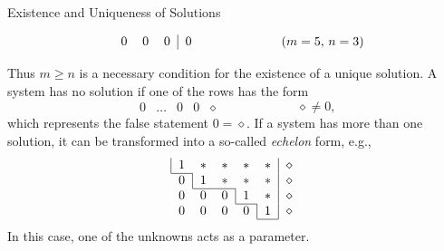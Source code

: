 \documentclass[smaller,hyperref={CJKbookmarks=true}]{beamer}
\begin{document}
\begin{frame}{Existence and Uniqueness of Solutions}
\begin{spacing}{1}
\begin{equation*}
\begin{array}{c}
   \begin{tabular}{ccc|c}
    0 & $0$ & $0$ & $0$ \\
  \end{tabular}
 \end{array}
 \qquad\qquad\qquad(m=5,\,n=3)
\end{equation*}
\end{spacing}
\newpage
\begin{spacing}{1.15}
Thus $m\geq n$ is a necessary condition for the existence of a unique solution.
A system has no solution if one of the rows has the form
\begin{equation*}
  \begin{array}{cccc|c}
    0 & \ldots & 0 & 0 & \diamond
  \end{array}
  \qquad\qquad\qquad
  \diamond\neq0,
\end{equation*}
which represents the false statement $0=\diamond.$
If a system has more than one solution, it can be transformed into a
so-called \emph{echelon} form, e.g.,
\begin{equation}\label{1.1.5}
 \begin{array}{c}
   \begin{tabular}{|ccccc|c}
     1 & $\ast$ & $\ast$ & $\ast$ & $\ast$ & $\diamond$ \\ \cline{1-1}
   \end{tabular} \\
   \begin{tabular}{c|cccc|c}
      0& $1$ & $\ast$ & $\ast$ & $\ast$ & $\diamond$ \\ \cline{2-3}
   \end{tabular} \\
   \begin{tabular}{ccc|cc|c}
      0& $0$ & $0$ & $1$ & $\ast$ & $\diamond$ \\ \cline{4-4}
   \end{tabular} \\
   \begin{tabular}{cccc|c|c}
      0& $0$ & $0$ & $0$ & $1$ & $\diamond$ \\ \cline{5-5}
   \end{tabular}
 \end{array}
\end{equation}
In this case, one of the unknowns acts as a parameter.
\end{spacing}
\end{frame}
\end{document}
